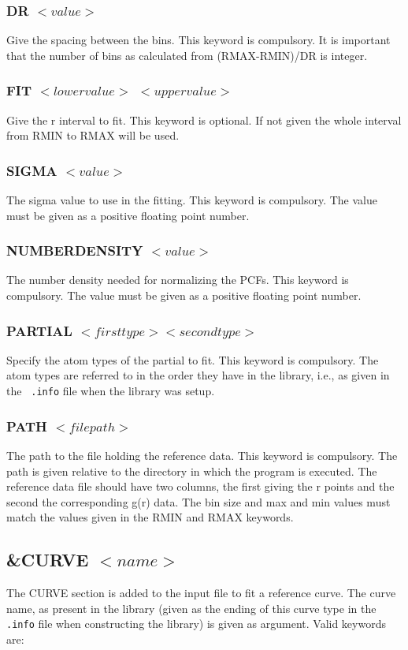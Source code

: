 \documentclass[a4paper, 10pt]{article}
\begin{document}
\subsubsection{DR $<value>$}
Give the spacing between the bins. This keyword is compulsory. It is
important that the number of bins as calculated from (RMAX-RMIN)/DR
is integer.

\subsubsection{FIT $<lower value>$ $<upper value>$}
Give the r interval to fit. This keyword is optional. If not given the whole
interval from RMIN to RMAX will be used.

\subsubsection{SIGMA $<value>$}
The sigma value to use in the fitting. This keyword is compulsory. The
value must be given as a positive floating point number.

\subsubsection{NUMBERDENSITY $<value>$}
The number density needed for normalizing the PCFs. This keyword is compulsory. The
value must be given as a positive floating point number.

\subsubsection{PARTIAL $<first type> <second type>$}
Specify the atom types of the partial to fit. This keyword is compulsory.
The atom types are referred
to in the order they have in the library, i.e., as given in the {\tt
  .info} file when the library was setup.

\subsubsection{PATH $<file path>$}
The path to the file holding the reference data. This
keyword is compulsory. The path is given
relative to the directory in which the program is executed.
The reference data file should have two columns, the first giving the
r points and the second the corresponding g(r) data. The bin size and
max and min values must match the values given in the RMIN and RMAX keywords.

\subsection{\&CURVE $<name>$}
The CURVE section is added to the input file to fit a reference
curve. The curve name, as present in the library (given as the ending
of this curve type in the {\tt .info} file when constructing the
library) is given as argument. Valid keywords are:
\end{document}
